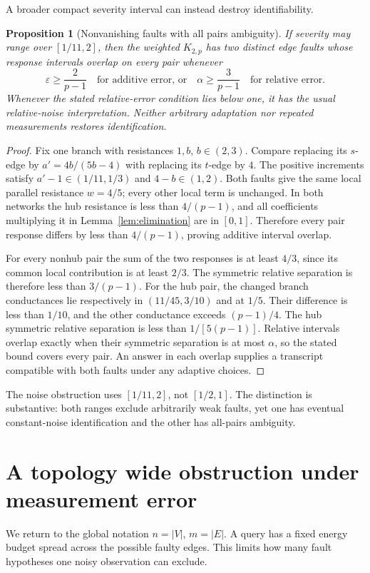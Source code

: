 \documentclass[11pt,letterpaper]{article}
\newtheorem{proposition}[theorem]{Proposition}
\begin{document}
A broader compact severity interval can instead destroy identifiability.
\begin{proposition}[Nonvanishing faults with all pairs ambiguity]\label{prop:severityimpossible}
If severity may range over $[1/11,2]$, then the weighted $K_{2,p}$ has two distinct edge faults whose response intervals overlap on every pair whenever
\[
 \varepsilon\ge\frac2{p-1}
 \quad\text{for additive error, or}\quad
 \alpha\ge\frac3{p-1}
 \quad\text{for relative error}.
\]
Whenever the stated relative-error condition lies below one, it has the usual relative-noise interpretation. Neither arbitrary adaptation nor repeated measurements restores identification.
\end{proposition}
\begin{proof}
Fix one branch with resistances $1,b$, $b\in(2,3)$. Compare replacing its $s$-edge by $a'=4b/(5b-4)$ with replacing its $t$-edge by $4$. The positive increments satisfy $a'-1\in(1/11,1/3)$ and $4-b\in(1,2)$. Both faults give the same local parallel resistance $w=4/5$; every other local term is unchanged. In both networks the hub resistance is less than $4/(p-1)$, and all coefficients multiplying it in Lemma~\ref{lem:elimination} are in $[0,1]$. Therefore every pair response differs by less than $4/(p-1)$, proving additive interval overlap.

For every nonhub pair the sum of the two responses is at least $4/3$, since its common local contribution is at least $2/3$. The symmetric relative separation is therefore less than $3/(p-1)$. For the hub pair, the changed branch conductances lie respectively in $(11/45,3/10)$ and at $1/5$. Their difference is less than $1/10$, and the other conductance exceeds $(p-1)/4$. The hub symmetric relative separation is less than $1/[5(p-1)]$. Relative intervals overlap exactly when their symmetric separation is at most $\alpha$, so the stated bound covers every pair. An answer in each overlap supplies a transcript compatible with both faults under any adaptive choices.
\end{proof}

The noise obstruction uses $[1/11,2]$, not $[1/2,1]$. The distinction is substantive: both ranges exclude arbitrarily weak faults, yet one has eventual constant-noise identification and the other has all-pairs ambiguity.

\section{A topology wide obstruction under measurement error}\label{sec:energynoise}
We return to the global notation $n=|V|$, $m=|E|$. A query has a fixed energy budget spread across the possible faulty edges. This limits how many fault hypotheses one noisy observation can exclude.
\end{document}
